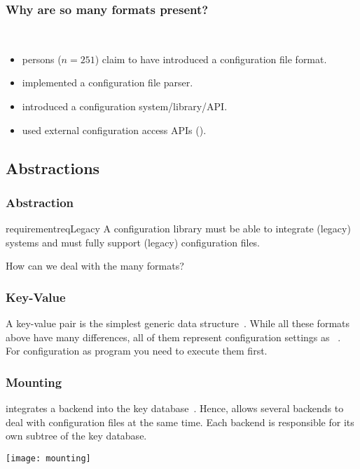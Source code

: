 \begin{frame}
	\frametitle{Why are so many formats present?}
	\methodQuestion{} ~\cite{raab2017challenges}
	\begin{itemize}
	\item {} persons ($n=251$) claim to have introduced a configuration file format.
	\item {} implemented a configuration file parser.
	\item {} introduced a configuration system/library/API.
	\item used external configuration access APIs ().
	\end{itemize}
\end{frame}



\subsection{Abstractions}

\begin{frame}
	\frametitle{Abstraction}
	\begin{restatable}{requirement}{reqLegacy}
	A configuration library must be able to integrate (legacy) systems and must fully support (legacy) configuration files.%
	\label{req:legacy}
	\end{restatable}

	\vspace{1cm}

	How can we deal with the many formats?
\end{frame}


\begin{frame}
	\frametitle{Key-Value}
A key-value pair is the simplest generic data structure~\cite{strang2004context}.
While all these formats above have many differences, all of them represent configuration settings as ~\cite{jin2014configurations,rabkin2011static,xu2013blame,lathia2013open}.
\\[1cm]

For configuration as program you need to execute them first.
\end{frame}

\begin{frame}
	\frametitle{Mounting}
	 integrates a backend into the key database~\cite{raab2008thesis}.
	Hence, \elektra{} allows several backends to deal with configuration files at the same time.
	Each backend is responsible for its own subtree of the key database.

	\texttt{[image: mounting]}
\end{frame}

